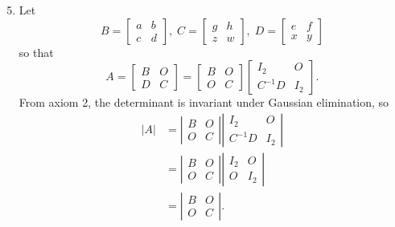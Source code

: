 \documentclass[a4paper, 12pt]{article}
\begin{document}
\begin{enumerate}
		\setcounter{enumi}{4}
		\item Let
		\[ B = \left[ \begin{array}{cc}
		a & b \\
		c & d
		\end{array} \right], \;
		C = \left[ \begin{array}{cc}
		g & h \\
		z & w
		\end{array} \right], \;
		D = \left[ \begin{array}{cc}
		e & f \\
		x & y
		\end{array} \right]\]
		so that
		\[ A = \left[ \begin{array}{cc}
		B & O \\
		D & C
		\end{array} \right]
		= \left[ \begin{array}{cc}
		B & O \\
		O & C
		\end{array} \right]
		\left[ \begin{array}{cc}
		I_2 & O \\
		C^{-1}D & I_2
		\end{array} \right]. \]
		From axiom 2, the determinant is invariant under Gaussian elimination, so
		\begin{align*}
		|A| &= \left| \begin{array}{cc}
		B & O \\
		O & C
		\end{array} \right|
		\left| \begin{array}{cc}
		I_2 & O \\
		C^{-1}D & I_2
		\end{array} \right| \\
		&= \left| \begin{array}{cc}
		B & O \\
		O & C
		\end{array} \right|
		\left| \begin{array}{cc}
		I_2 & O \\
		O & I_2
		\end{array} \right| \\
		&= \left| \begin{array}{cc}
		B & O \\
		O & C
		\end{array} \right|.
		\end{align*}
	\end{enumerate}
	
\end{document}
